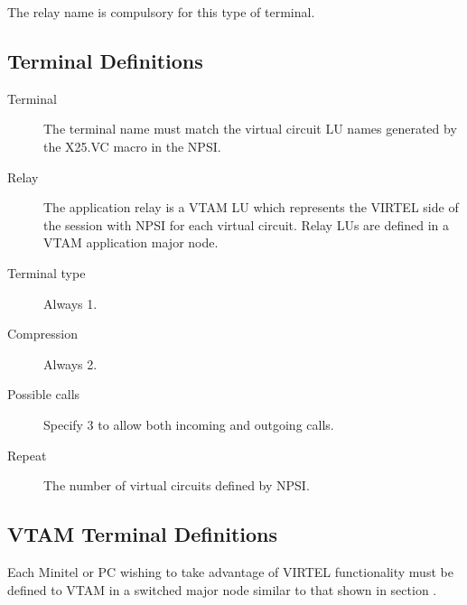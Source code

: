 \documentclass[letterpaper,10pt,english]{sphinxmanual}
\begin{document}
The relay name is compulsory for this type of terminal.


\ignorespaces 

\subsection{Terminal Definitions}
\label{\detokenize{connectivity_guide:index-70}}\label{\detokenize{connectivity_guide:id32}}\begin{description}
\item[{Terminal}] \leavevmode
The terminal name must match the virtual circuit LU names generated
by the X25.VC macro in the NPSI.

\item[{Relay}] \leavevmode
The application relay is a VTAM LU which represents the VIRTEL side
of the session with NPSI for each virtual circuit. Relay LUs are
defined in a VTAM application major node.

\item[{Terminal type}] \leavevmode
Always 1.

\item[{Compression}] \leavevmode
Always 2.

\item[{Possible calls}] \leavevmode
Specify 3 to allow both incoming and outgoing calls.

\item[{Repeat}] \leavevmode
The number of virtual circuits defined by NPSI.

\end{description}

\ignorespaces 

\subsection{VTAM Terminal Definitions}
\label{\detokenize{connectivity_guide:index-71}}\label{\detokenize{connectivity_guide:id33}}
Each Minitel or PC wishing to take advantage of VIRTEL functionality must be defined to VTAM in a switched major node similar to that shown in section {\hyperref[\detokenize{connectivity_guide:v461cn-x25gateline}]{}}.
\end{document}
